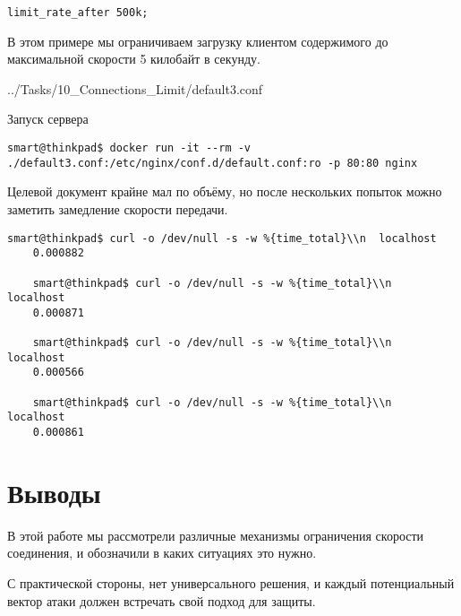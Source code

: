 \texttt{limit\_rate\_after 500k;}

В этом примере мы ограничиваем загрузку клиентом содержимого до максимальной скорости 5 килобайт в секунду.

{../Tasks/10_Connections_Limit/default3.conf}

Запуск сервера
\begin{Verbatim}[frame=single,breaklines=true,breakanywhere=true]
    smart@thinkpad$ docker run -it --rm -v ./default3.conf:/etc/nginx/conf.d/default.conf:ro -p 80:80 nginx
\end{Verbatim}

Целевой документ крайне мал по объёму, но после нескольких попыток можно заметить замедление скорости передачи.
\begin{Verbatim}[frame=single,breaklines=true,breakanywhere=true]
    smart@thinkpad$ curl -o /dev/null -s -w %{time_total}\\n  localhost
    0.000882

    smart@thinkpad$ curl -o /dev/null -s -w %{time_total}\\n  localhost
    0.000871

    smart@thinkpad$ curl -o /dev/null -s -w %{time_total}\\n  localhost
    0.000566

    smart@thinkpad$ curl -o /dev/null -s -w %{time_total}\\n  localhost
    0.000861
\end{Verbatim}

\section*{Выводы}

В этой работе мы рассмотрели различные механизмы ограничения скорости соединения, и обозначили в каких ситуациях это нужно.

С практической стороны, нет универсального решения, и каждый потенциальный вектор атаки должен встречать свой подход для защиты.
